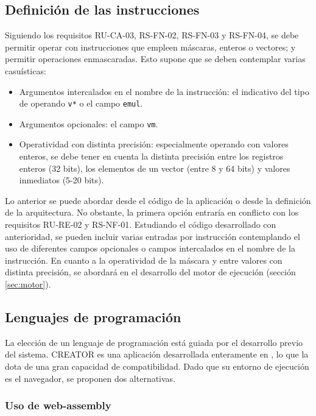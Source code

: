 \subsection{Definición de las instrucciones}\label{subsec:defi-ins}

Siguiendo los requisitos RU-CA-03, RS-FN-02, RS-FN-03 y RS-FN-04, se debe permitir operar con instrucciones que empleen máscaras, enteros o vectores; y permitir operaciones enmascaradas. Esto supone que se deben contemplar varias casuísticas:

\begin{itemize}
\item Argumentos intercalados en el nombre de la instrucción: el indicativo del tipo de operando \texttt{v*} o el campo \texttt{emul}.
\item Argumentos opcionales: el campo \texttt{vm}.
\item Operatividad con distinta precisión: especialmente operando con valores enteros, se debe tener en cuenta la distinta precisión entre los registros enteros (32 bits), los elementos de un vector (entre 8 y 64 bits) y valores inmediatos (5-20 bits).
\end{itemize}

Lo anterior se puede abordar desde el código de la aplicación o desde la definición de la arquitectura. No obstante, la primera opción entraría en conflicto con los requisitos RU-RE-02 y RS-NF-01. Estudiando el código desarrollado con anterioridad, se pueden incluir varias entradas por instrucción contemplando el uso de diferentes campos opcionales o campos intercalados en el nombre de la instrucción. En cuanto a la operatividad de la máscara y entre valores con distinta precisión, se abordará en el desarrollo del motor de ejecución (sección \ref{sec:motor}).

\subsection{Lenguajes de programación}{\label{subsec:programming-languages}}
La elección de un lenguaje de programación está guiada por el desarrollo previo
del sistema. CREATOR es una aplicación desarrollada enteramente en
\js, lo que la dota de una gran capacidad de
compatibilidad. Dado que su entorno de ejecución es el navegador, se proponen
dos alternativas.

\subsubsection{Uso de web-assembly}

